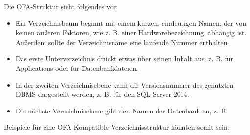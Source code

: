           Die OFA-Struktur sieht folgendes vor:
          \begin{itemize}
            \item Ein Verzeichnisbaum beginnt mit einem kurzen, eindeutigen
            Namen, der von keinen äußeren Faktoren, wie z. B. einer
            Hardwarebezeichnung, abhängig ist. Außerdem sollte der
            Verzeichnisname eine laufende Nummer enthalten.
            \item Das erste Unterverzeichnis drückt etwas über seinen Inhalt
            aus, z. B.  für Applications oder 
            für Datenbankdateien.
            \item In der zweiten Verzeichnisebene kann die Versionsnummer des
            genutzten DBMS dargestellt werden, z. B.  für den SQL
            Server 2014.
            \item Die nächste Verzeichnisebene gibt den Namen der Datenbank an,
            z. B. 
          \end{itemize}
          Beispiele für eine OFA-Kompatible Verzeichnisstruktur könnten somit
          sein:
          
          
          
          
          
